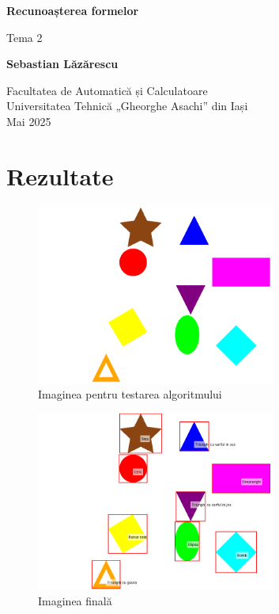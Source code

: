 \documentclass[12pt]{article}
\begin{document}
\begin{titlepage}
    \begin{center}
        \vspace*{1cm}

        \Huge
        \textbf{Recunoașterea formelor}

        \vspace{0.5cm}
        \LARGE
        Tema 2

        \vspace{1.5cm}

        \textbf{Sebastian Lăzărescu}

        \vfill

        \Large
        Facultatea de Automatică și Calculatoare\\
        Universitatea Tehnică „Gheorghe Asachi” din Iași\\
        Mai 2025
    \end{center}
\end{titlepage}

\section{Rezultate}

\begin{figure}[H]
    \centering
    \includegraphics[width=0.7\textwidth]{../images/shapes.png}
    \caption{Imaginea pentru testarea algoritmului}
\end{figure}

\begin{figure}[H]
    \centering
    \includegraphics[width=0.7\textwidth]{../images/final_image.png}
    \caption{Imaginea finală}
\end{figure}
\end{document}
